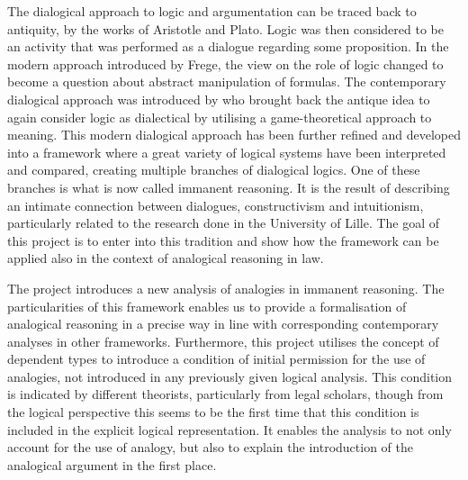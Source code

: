 			The dialogical approach to logic and argumentation can be traced back to antiquity, by the works of Aristotle and Plato. Logic was then considered to be an activity that was performed as a dialogue regarding some proposition. In the modern approach introduced by Frege, the view on the role of logic changed to become a question about abstract manipulation of formulas. The contemporary dialogical approach was introduced by \textcite{lorenzen1961dialogisches} who brought back the antique idea to again consider logic as dialectical by utilising a game-theoretical approach to meaning. This modern dialogical approach has been further refined and developed into a framework where a great variety of logical systems have been interpreted and compared, creating multiple branches of dialogical logics. One of these branches is what is now called immanent reasoning. It is the result of describing an intimate connection between dialogues, constructivism and intuitionism, particularly related to the research done in the University of Lille. The goal of this project is to enter into this tradition and show how the framework can be applied also in the context of analogical reasoning in law. 
			
			The project introduces a new analysis of analogies in immanent reasoning. The particularities of this framework enables us to provide a formalisation of analogical reasoning in a precise way in line with corresponding contemporary analyses in other frameworks. Furthermore, this project utilises the concept of dependent types to introduce a condition of initial permission for the use of analogies, not introduced in any previously given logical analysis. This condition is indicated by different theorists, particularly from legal scholars, though from the logical perspective this seems to be the first time that this condition is included in the explicit logical representation. It enables the analysis to not only account for the use of analogy, but also to explain the introduction of the analogical argument in the first place. 































